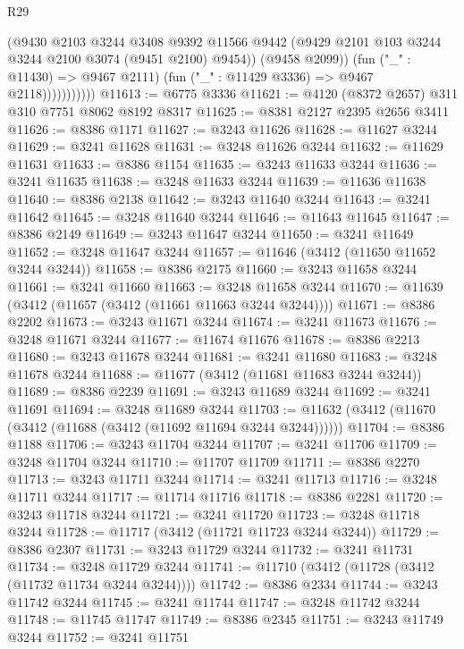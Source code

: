 \begin{lexlean}{R29}
\begin{coremodule}
                          (@9430
                            @2103
                            @3244
                            @3408
                            @9392
                            @11566
                            @9442
                            (@9429 @2101 @103 @3244 @3244 @2100 @3074 (@9451 @2100) @9454))
                          (@9458 @2099))
                        (fun ("_" : @11430) => @9467 @2111)
                        (fun ("_" : @11429 @3336) => @9467 @2118)))))))))))
@11613 := @6775 @3336
@11621 := @4120 (@8372 @2657) @311 @310 @7751 @8062 @8192 @8317
@11625 := @8381 @2127 @2395 @2656 @3411
@11626 := @8386 @1171
@11627 := @3243 @11626
@11628 := @11627 @3244
@11629 := @3241 @11628
@11631 := @3248 @11626 @3244
@11632 := @11629 @11631
@11633 := @8386 @1154
@11635 := @3243 @11633 @3244
@11636 := @3241 @11635
@11638 := @3248 @11633 @3244
@11639 := @11636 @11638
@11640 := @8386 @2138
@11642 := @3243 @11640 @3244
@11643 := @3241 @11642
@11645 := @3248 @11640 @3244
@11646 := @11643 @11645
@11647 := @8386 @2149
@11649 := @3243 @11647 @3244
@11650 := @3241 @11649
@11652 := @3248 @11647 @3244
@11657 := @11646 (@3412 (@11650 @11652 @3244 @3244))
@11658 := @8386 @2175
@11660 := @3243 @11658 @3244
@11661 := @3241 @11660
@11663 := @3248 @11658 @3244
@11670 := @11639 (@3412 (@11657 (@3412 (@11661 @11663 @3244 @3244))))
@11671 := @8386 @2202
@11673 := @3243 @11671 @3244
@11674 := @3241 @11673
@11676 := @3248 @11671 @3244
@11677 := @11674 @11676
@11678 := @8386 @2213
@11680 := @3243 @11678 @3244
@11681 := @3241 @11680
@11683 := @3248 @11678 @3244
@11688 := @11677 (@3412 (@11681 @11683 @3244 @3244))
@11689 := @8386 @2239
@11691 := @3243 @11689 @3244
@11692 := @3241 @11691
@11694 := @3248 @11689 @3244
@11703 := @11632 (@3412 (@11670 (@3412 (@11688 (@3412 (@11692 @11694 @3244 @3244))))))
@11704 := @8386 @1188
@11706 := @3243 @11704 @3244
@11707 := @3241 @11706
@11709 := @3248 @11704 @3244
@11710 := @11707 @11709
@11711 := @8386 @2270
@11713 := @3243 @11711 @3244
@11714 := @3241 @11713
@11716 := @3248 @11711 @3244
@11717 := @11714 @11716
@11718 := @8386 @2281
@11720 := @3243 @11718 @3244
@11721 := @3241 @11720
@11723 := @3248 @11718 @3244
@11728 := @11717 (@3412 (@11721 @11723 @3244 @3244))
@11729 := @8386 @2307
@11731 := @3243 @11729 @3244
@11732 := @3241 @11731
@11734 := @3248 @11729 @3244
@11741 := @11710 (@3412 (@11728 (@3412 (@11732 @11734 @3244 @3244))))
@11742 := @8386 @2334
@11744 := @3243 @11742 @3244
@11745 := @3241 @11744
@11747 := @3248 @11742 @3244
@11748 := @11745 @11747
@11749 := @8386 @2345
@11751 := @3243 @11749 @3244
@11752 := @3241 @11751

\end{coremodule}
\end{lexlean}

